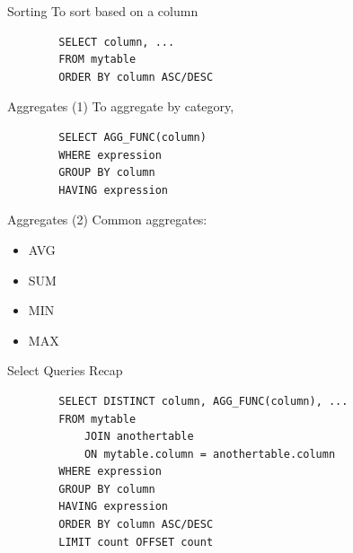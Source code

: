 \documentclass{beamer}
\begin{document}
    \begin{frame}[fragile]{Sorting}
        To \alert{sort} based on a column
        \begin{verbatim}
        SELECT column, ...
        FROM mytable
        ORDER BY column ASC/DESC
        \end{verbatim}
    \end{frame}

    
    \begin{frame}[fragile]{Aggregates (1)}
        To \alert{aggregate} by category,
        \begin{verbatim}
        SELECT AGG_FUNC(column)
        WHERE expression
        GROUP BY column
        HAVING expression
        \end{verbatim}
    \end{frame}


    \begin{frame}[fragile]{Aggregates (2)}
        Common aggregates:
        \begin{itemize}
            \item AVG
            \item SUM
            \item MIN 
            \item MAX
        \end{itemize}
    \end{frame}

    \begin{frame}[fragile]{Select Queries Recap}
    
        \begin{verbatim}
        SELECT DISTINCT column, AGG_FUNC(column), ...
        FROM mytable
            JOIN anothertable
            ON mytable.column = anothertable.column
        WHERE expression
        GROUP BY column
        HAVING expression
        ORDER BY column ASC/DESC 
        LIMIT count OFFSET count
        \end{verbatim}

    \end{frame}
\end{document}
